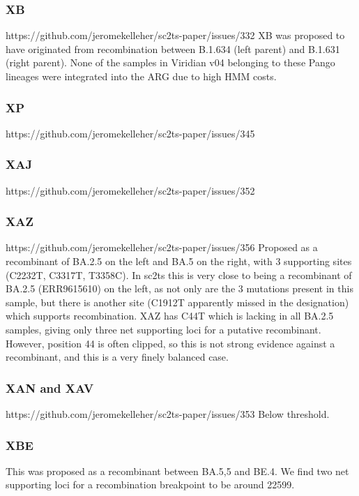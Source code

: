 \documentclass[12pt,letterpaper]{article}
\begin{document}
\subsubsection*{XB}
https://github.com/jeromekelleher/sc2ts-paper/issues/332
XB was proposed to have originated from recombination between B.1.634 (left parent) and B.1.631 (right parent).
None of the samples in Viridian v04 belonging to these Pango lineages were integrated into the ARG due to high HMM costs.

\subsubsection*{XP}
https://github.com/jeromekelleher/sc2ts-paper/issues/345

\subsubsection*{XAJ}
https://github.com/jeromekelleher/sc2ts-paper/issues/352

\subsubsection*{XAZ}
https://github.com/jeromekelleher/sc2ts-paper/issues/356
Proposed as a recombinant of BA.2.5 on the left and BA.5 on the right, with 3 supporting sites (C2232T, C3317T, T3358C).
In sc2ts this is very close to being a recombinant of BA.2.5 (ERR9615610) on the left,
as not only are the 3 mutations present in this sample,
but there is another site (C1912T apparently missed in the designation) which supports recombination.
XAZ has C44T which is lacking in all BA.2.5 samples,
giving only three net supporting loci for a putative recombinant.
However, position 44 is often clipped, so this is not strong evidence against a recombinant, and
this is a very finely balanced case.

\subsubsection*{XAN and XAV}
https://github.com/jeromekelleher/sc2ts-paper/issues/353
Below threshold.

\subsubsection*{XBE}
This was proposed as a recombinant between BA.5,5 and BE.4.
We find two net supporting loci for a recombination breakpoint to be around 22599.
\end{document}
